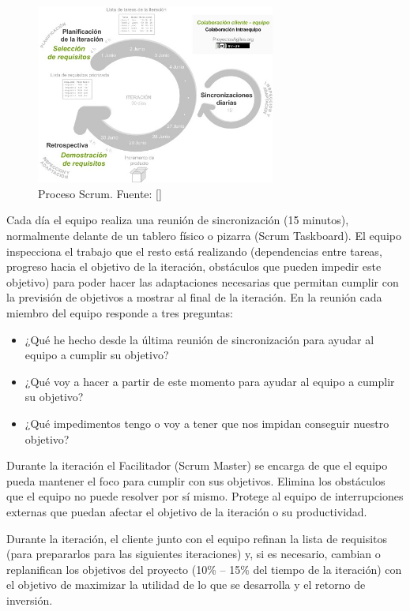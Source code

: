 {{ \begin{figure}[H]
  \centering
  \includegraphics[width=0.7\textwidth]{../img/Metodologia Scrum.jpeg}
  \caption{Proceso Scrum. Fuente: [\cite{scrum2021}]}
  \label{fig:scrum}
  \end{figure} 

Cada día el equipo realiza una reunión de sincronización (15 minutos), normalmente delante de un tablero físico o pizarra (Scrum Taskboard). El equipo inspecciona el trabajo que el resto está realizando (dependencias entre tareas, progreso hacia el objetivo de la iteración, obstáculos que pueden impedir este objetivo) para poder hacer las adaptaciones necesarias que permitan cumplir con la previsión de objetivos a mostrar al final de la iteración. En la reunión cada miembro del equipo responde a tres preguntas: 

\begin{itemize}
    \item ¿Qué he hecho desde la última reunión de sincronización para ayudar al equipo a cumplir su objetivo?
    \item ¿Qué voy a hacer a partir de este momento para ayudar al equipo a cumplir su objetivo?
    \item ¿Qué impedimentos tengo o voy a tener que nos impidan conseguir nuestro objetivo?
\end{itemize}

Durante la iteración el Facilitador (Scrum Master) se encarga de que el equipo pueda mantener el foco para cumplir con sus objetivos. 
Elimina los obstáculos que el equipo no puede resolver por sí mismo. 
Protege al equipo de interrupciones externas que puedan afectar el objetivo de la iteración o su productividad. 

Durante la iteración, el cliente junto con el equipo refinan la lista de requisitos (para prepararlos para las siguientes iteraciones) y, si es necesario, cambian o replanifican los objetivos del proyecto (10\% -- 15\% del tiempo de la iteración)
 con el objetivo de maximizar la utilidad de lo que se desarrolla y el retorno de inversión. 

}}
